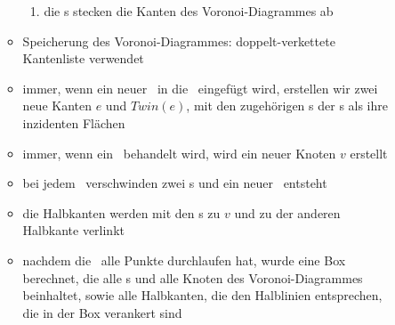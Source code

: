 \begin{itemize}
\begin{description}
\begin{itemize}
\begin{enumerate}
							\item die \bpoint s stecken die Kanten des Voronoi-Diagrammes ab
						\end{enumerate}
					\up\item Speicherung des Voronoi-Diagrammes: doppelt-verkettete Kantenliste verwendet
					\vspace*{-0.5\baselineskip}\item immer, wenn ein neuer \bpoint~in die \beach~eingefügt wird, erstellen wir zwei neue Kanten $e$ und $Twin(e)$, mit den zugehörigen \site s der \bpoint s als ihre inzidenten Flächen
					\vspace*{-0.5\baselineskip}\item immer, wenn ein \kreis~behandelt wird, wird ein neuer Knoten $v$ erstellt
					\vspace*{-0.5\baselineskip}\item bei jedem \kreis~verschwinden zwei \bpoint s und ein neuer \bpoint~entsteht
				\end{itemize}\up
				\begin{minipage}{0.3\textwidth}
					
				\end{minipage}\hfill
				\begin{minipage}{0.6\textwidth}
					\vspace*{-3\baselineskip}\begin{itemize}
						\item die Halbkanten werden mit den \bpoint s zu $v$ und zu der anderen Halbkante verlinkt
						\vspace*{-0.5\baselineskip}\item nachdem die \sweep~alle Punkte durchlaufen hat, wurde eine Box berechnet, die alle \site s und alle Knoten des Voronoi-Diagrammes beinhaltet, sowie alle Halbkanten, die den Halblinien entsprechen, die in der Box verankert sind
					\end{itemize}
				\end{minipage}
		\end{description}
\end{itemize}
\topbreak
\up\up
